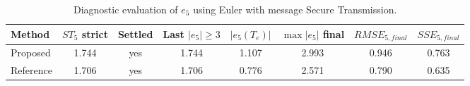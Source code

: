 \begin{table}[!t]
\centering
\caption{Diagnostic evaluation of $e_5$ using Euler with message Secure Transmission.}
\begin{tabular}{lccccccc}
\hline
Method & $ST_5$ strict & Settled & Last $|e_5|\ge 3$ & $|e_5(T_e)|$ & $\max|e_5|$ final & $RMSE_{5,final}$ & $SSE_{5,final}$ \\
\hline
Proposed & 1.744 & yes & 1.744 & 1.107 & 2.993 & 0.946 & 0.763 \\
Reference & 1.706 & yes & 1.706 & 0.776 & 2.571 & 0.790 & 0.635 \\
\hline
\end{tabular}
\end{table}
